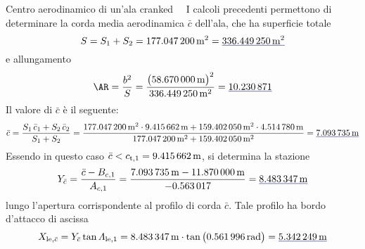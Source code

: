 \documentclass[[12pt,twoside]{book}
\begin{document}
\begin{myExampleX}{Centro aerodinamico di un'ala cranked}{\ \myIconGraph\ }
I calcoli precedenti permettono di determinare la corda media aerodinamica $\bar{c}$ dell'ala,
che ha superficie totale
\[
S = S_1 + S_2
  = \SI[round-precision=1]{\myAreaWingIMTsquared}{\metre^2}
    = \mathunderline{mydarkblue}{
      \SI[round-precision=1]{\myAreaWingCrankedMTsquared}{\metre^2}
    }
\]
e allungamento
\[
\AR = \frac{b^2}{S} 
    = \frac{
        \big( \SI[round-precision=2]{\mySpanWingMT}{\meter} \big)^2
      }{
        \SI[round-precision=1]{\myAreaWingCrankedMTsquared}{\metre^2}
      }
    = \mathunderline{mydarkblue}{
      \SI[round-precision=2]{\myAspectRatioWingCranked}{}
    }
\]
Il valore di $\bar{c}$ è il seguente:
\[
\bar{c} = \frac{S_1 \, \bar{c}_1 + S_2 \, \bar{c}_2} {S_1 + S_2}
  =
  \frac{\SI[round-precision=1]{\myAreaWingIMTsquared}{\metre^2} \cdot \SI[round-precision=2]{\myMACWingIMT}{\metre} + \SI[round-precision=1]{\myAreaWingIIMTsquared}{\metre^2} \cdot \SI[round-precision=2]{\myMACWingIIMT}{\metre}}{\SI[round-precision=1]{\myAreaWingIMTsquared}{\metre^2} + \SI[round-precision=1]{\myAreaWingIIMTsquared}{\metre^2}}
    = \mathunderline{mydarkblue}{ \SI[round-precision=2]{\myMACWingCrankedMT}{\metre} }
\]
Essendo in questo caso
$\bar{c} < c_{\mathrm{t},1}=\SI[round-precision=2]{\myMACWingIMT}{\metre}$,
si determina la stazione
\[
  Y_{\bar{c}} 
    = \frac{\bar{c} - B_{c,1}}{A_{c,1}}
    = \frac{
        \SI[round-precision=2]{\myMACWingCrankedMT}{\metre} 
        - \SI[round-precision=2]{\myCoeffBChordWingIMT}{\metre}
      }{
        \SI[round-precision=3]{\myCoeffAChordWingI}{}
      }
    = \mathunderline{mydarkblue}{
      \SI[round-precision=2]{\myYYMACWingCrankedMT}{\metre}
    }
\]
lungo l'apertura corrispondente al profilo di corda $\bar{c}$. Tale profilo
ha bordo d'attacco di ascissa
\[
X_{\mathrm{le},\bar{c}} 
  = Y_{\bar{c}} \tan \Lambda_{\mathrm{le},1}
  =
   \SI[round-precision=2]{\myYYMACWingCrankedMT}{\metre}
   \cdot
	\tan \big( \SI[round-precision=3]{\mySweepLEWingIRAD}{\radian} \big)
	= \mathunderline{mydarkblue}{ \SI[round-precision=2]{\myXXMACLEToApexWingCrankedMT}{\metre} }
\]



\end{myExampleX}
\end{document}
